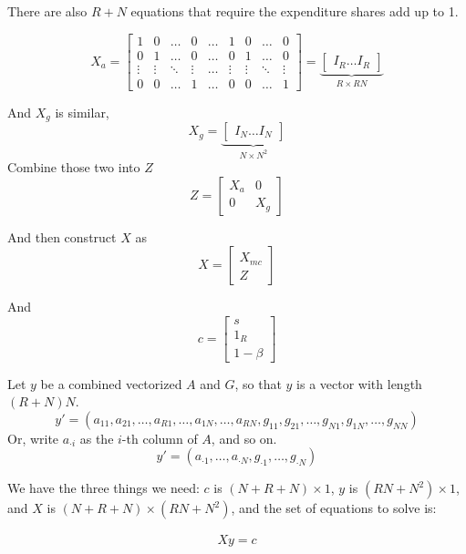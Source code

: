 \documentclass[11pt]{article}
\begin{document}
There are also $R+N$ equations that require the expenditure shares add up to 1.

\[
X_{a} = 
\begin{bmatrix}
    1 & 0 &\dots  & 0 & \dots & 1 & 0 & \dots & 0\\
    0 & 1 &\dots  & 0 & \dots & 0 & 1 &\dots  & 0\\
    \vdots & \vdots & \ddots & \vdots & \dots & \vdots & \vdots & \ddots & \vdots \\
    0 & 0 & \dots  & 1 & \dots & 0 & 0 &\dots  & 1
\end{bmatrix} = 
\underbrace{\begin{bmatrix}
I_R \ldots I_R
\end{bmatrix}}_{R \times R N}
\]

And $X_g$ is similar,
\[
X_{g} = 
\underbrace{\begin{bmatrix}
I_N \ldots I_N
\end{bmatrix}}_{N \times N^2}
\]
Combine those two into $Z$
\[
Z = 
\begin{bmatrix}
X_a & 0 \\
0 & X_g
\end{bmatrix}
\]


And then construct $X$ as
\[
X = 
\begin{bmatrix}
X_{mc} \\
Z
\end{bmatrix}
\]

And 
\[
c = 
\begin{bmatrix}
s \\
1_R \\
1-\beta
\end{bmatrix}
\]

Let $y$ be a combined vectorized $A$ and $G$, so that $y$ is a vector with length $(R + N) N$. 
\[ 
y' = (a_{11},a_{21},\ldots,a_{R1},\ldots,a_{1N},\ldots,a_{RN},g_{11},g_{21},\ldots,g_{N1},g_{1N},\ldots,g_{NN}) 
\]
Or, write $a_{\cdot i}$ as the $i$-th column of $A$, and so on.
\[ y' = (a_{\cdot 1},\ldots,a_{ \cdot N},g_{ \cdot 1},\ldots,g_{ \cdot N})\]

We have the three things we need: $c$ is $(N + R + N) \times 1$, $y$ is $(RN + N^2)\times 1$, and $X$ is $(N+R+N)\times (RN + N^2)$, and the set of equations to solve is:

\begin{gather}
X y = c
\end{gather}
\end{document}

